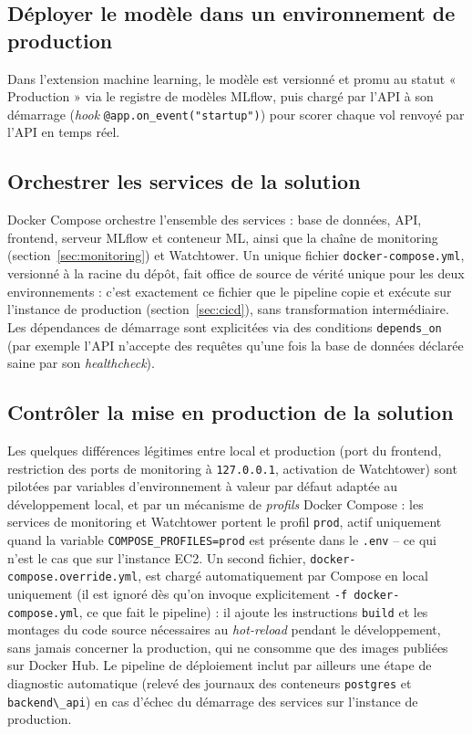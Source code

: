 \documentclass[11pt,a4paper]{report}
\newcommand{\code}[1]{\lstinline{#1}}
\begin{document}
\subsection{Déployer le modèle dans un environnement de production}

Dans l'extension machine learning, le modèle est versionné et promu au statut « Production » via le registre de modèles MLflow, puis chargé par l'API à son démarrage (\emph{hook} \code{@app.on_event("startup")}) pour scorer chaque vol renvoyé par l'API en temps réel.

\subsection{Orchestrer les services de la solution}

Docker Compose orchestre l'ensemble des services : base de données, API, frontend, serveur MLflow et conteneur ML, ainsi que la chaîne de monitoring (section~\ref{sec:monitoring}) et Watchtower. Un unique fichier \code{docker-compose.yml}, versionné à la racine du dépôt, fait office de source de vérité unique pour les deux environnements : c'est exactement ce fichier que le pipeline copie et exécute sur l'instance de production (section~\ref{sec:cicd}), sans transformation intermédiaire. Les dépendances de démarrage sont explicitées via des conditions \code{depends_on} (par exemple l'API n'accepte des requêtes qu'une fois la base de données déclarée saine par son \emph{healthcheck}).

\subsection{Contrôler la mise en production de la solution}

Les quelques différences légitimes entre local et production (port du frontend, restriction des ports de monitoring à \code{127.0.0.1}, activation de Watchtower) sont pilotées par variables d'environnement à valeur par défaut adaptée au développement local, et par un mécanisme de \emph{profils} Docker Compose : les services de monitoring et Watchtower portent le profil \code{prod}, actif uniquement quand la variable \code{COMPOSE_PROFILES=prod} est présente dans le \code{.env} -- ce qui n'est le cas que sur l'instance EC2. Un second fichier, \code{docker-compose.override.yml}, est chargé automatiquement par Compose en local uniquement (il est ignoré dès qu'on invoque explicitement \code{-f docker-compose.yml}, ce que fait le pipeline) : il ajoute les instructions \code{build} et les montages du code source nécessaires au \emph{hot-reload} pendant le développement, sans jamais concerner la production, qui ne consomme que des images publiées sur Docker Hub. Le pipeline de déploiement inclut par ailleurs une étape de diagnostic automatique (relevé des journaux des conteneurs \code{postgres} et \code{backend\_api}) en cas d'échec du démarrage des services sur l'instance de production.
\end{document}
